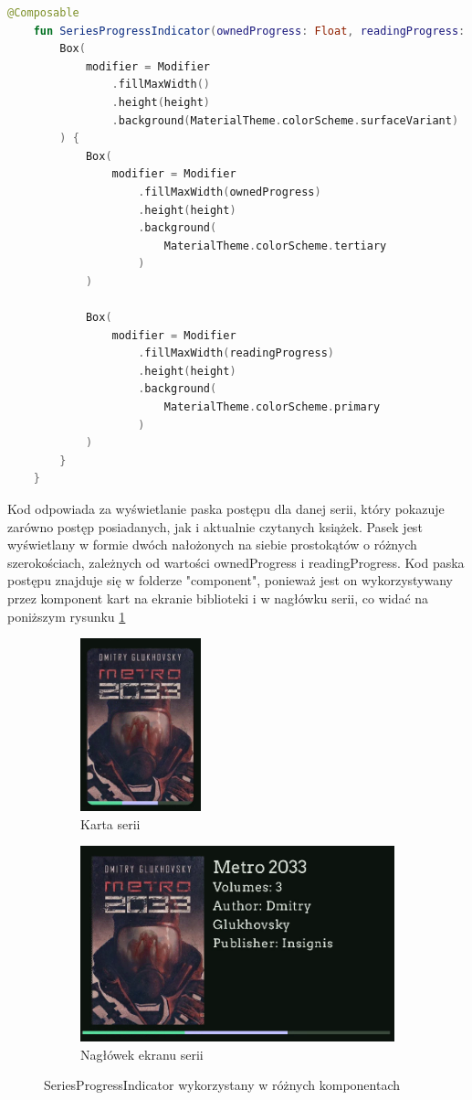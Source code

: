 \documentclass[12pt,twoside]{article}
\begin{document}
\begin{lstlisting}[language=Kotlin,caption=kod funkcji SeriesProgressIndicator, label={SeriesProgressIndicator}]
	@Composable
	fun SeriesProgressIndicator(ownedProgress: Float, readingProgress: Float, height: Dp) {
		Box(
			modifier = Modifier
				.fillMaxWidth()
				.height(height)
				.background(MaterialTheme.colorScheme.surfaceVariant)
		) {
			Box(
				modifier = Modifier
					.fillMaxWidth(ownedProgress)
					.height(height)
					.background(
						MaterialTheme.colorScheme.tertiary
					)
			)
	
			Box(
				modifier = Modifier
					.fillMaxWidth(readingProgress)
					.height(height)
					.background(
						MaterialTheme.colorScheme.primary
					)
			)
		}
	}
\end{lstlisting}
Kod odpowiada za wyświetlanie paska postępu dla danej serii, który pokazuje zarówno postęp posiadanych, jak i 
aktualnie czytanych książek. Pasek jest wyświetlany w formie dwóch nałożonych na siebie prostokątów o różnych 
szerokościach, zależnych od wartości ownedProgress i readingProgress. Kod paska postępu znajduje się w folderze
"component", ponieważ jest on wykorzystywany przez komponent kart na ekranie biblioteki i w nagłówku serii, co widać
na poniższym rysunku \ref{fig:SeriesProgressIndicator}

\begin{figure}[ht]
	\centering
	\begin{subfigure}[b]{0.2\textwidth}
	  \includegraphics[]{figures/karta.png}
	  \caption{Karta serii}
	\end{subfigure}
	\hfill
	\begin{subfigure}[b]{0.6\textwidth}
	  \includegraphics[]{figures/header.png}
	  \caption{Nagłówek ekranu serii}
	\end{subfigure}
	\caption{SeriesProgressIndicator wykorzystany w różnych komponentach}
	\label{fig:SeriesProgressIndicator}
\end{figure}
\end{document}
